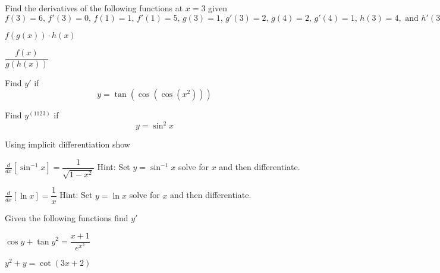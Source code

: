 \documentclass[unboxed]{hwset}
\begin{document}
\begin{problem}[1.] 
	Find the derivatives of the following functions at $x=3$ given\\ 
	$f(3)=6,\, f'(3)=0,\, f(1)=1,\, f'(1)=5,\, g(3)=1,\, g'(3)=2,\, g(4)=2,\,
	g'(4)=1,\, h(3)=4, \text{ and } h'(3)=2$ 
	\be
		\item $f(g(x))\cdot h(x)$
		\item $\dfrac{f(x)}{g(h(x))}$
	\ee
\end{problem}

\begin{problem}[2.]
	\be
		\item Find $y'$ if 
		\begin{equation*}
			y=\tan(\cos (\cos (x^2)))
		\end{equation*}
		\item Find $y^{(1123)}$ if 
		\begin{equation*}
			y=\sin^2 x
		\end{equation*}
	\ee
\end{problem}

\begin{problem}[3.]
	Using implicit differentiation show
	\be
		\item $\frac{d}{dx}\left[\sin^{-1} x\right] = \dfrac{1}{\sqrt{1 - x^2}}$
		Hint: Set $y=\sin^{-1} x$ solve for $x$ and then differentiate.
		\item $\frac{d}{dx} \left[\ln x\right] = \dfrac{1}{x}$ 
		Hint: Set $y=\ln x$ solve for $x$ and then differentiate.
	\ee
\end{problem}

\begin{problem}[4.] 
	Given the following functions find $y'$
	\be
		\item $\cos y + \tan y^2 = \dfrac{x+1}{e^{x^2}}$
		\item $y^2 + y = \cot(3x +2)$
	\ee
\end{problem}
\end{document}

